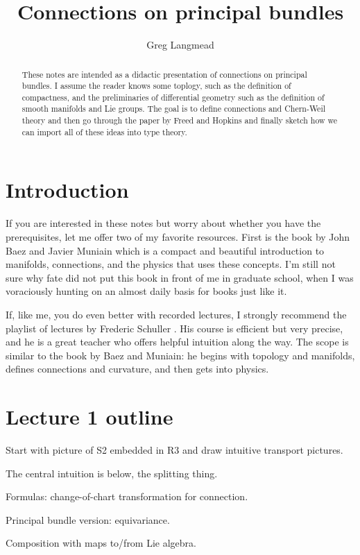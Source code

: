 \documentclass[12pt]{article}
\title{Connections on principal bundles}
\author{Greg Langmead}
\begin{document}
\maketitle
\begin{abstract}
These notes are intended as a didactic presentation of connections on principal bundles. I assume the reader knows some toplogy, such as the definition of compactness, and the preliminaries of differential geometry such as the definition of smooth manifolds and Lie groups. The goal is to define connections and Chern-Weil theory and then go through the paper by Freed and Hopkins \cite{freed2013chernweil} and finally sketch how we can import all of these ideas into type theory.
\end{abstract}
\tableofcontents
\section{Introduction}
If you are interested in these notes but worry about whether you have the prerequisites, let me offer two of my favorite resources. First is the book by John Baez and Javier Muniain \cite{baez1994gauge} which is a compact and beautiful introduction to manifolds, connections, and the physics that uses these concepts. I'm still not sure why fate did not put this book in front of me in graduate school, when I was voraciously hunting on an almost daily basis for books just like it.

If, like me, you do even better with recorded lectures, I strongly recommend the playlist of lectures by Frederic Schuller \cite{schullerYoutube2015}. His course is efficient but very precise, and he is a great teacher who offers helpful intuition along the way. The scope is similar to the book by Baez and Muniain: he begins with topology and manifolds, defines connections and curvature, and then gets into physics.

\section{Lecture 1 outline}
Start with picture of S2 embedded in R3 and draw intuitive transport pictures.

The central intuition is below, the splitting thing.

Formulas: change-of-chart transformation for connection.

Principal bundle version: equivariance.

Composition with maps to/from Lie algebra.
\end{document}
